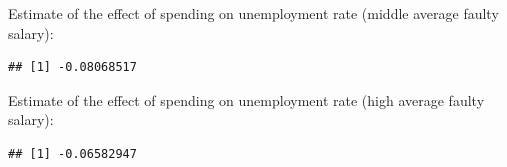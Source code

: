 \documentclass{article}\usepackage[]{graphicx}\usepackage[]{color}
\makeatletter
\newenvironment{kframe}{%
 \def\at@end@of@kframe{}%
 \ifinner\ifhmode%
  \def\at@end@of@kframe{\end{minipage}}%
  \begin{minipage}{\columnwidth}%
 \fi\fi%
 \def\FrameCommand##1{\hskip\@totalleftmargin \hskip-\fboxsep
 \colorbox{shadecolor}{##1}\hskip-\fboxsep
     \hskip-\linewidth \hskip-\@totalleftmargin \hskip\columnwidth}%
 \MakeFramed {\advance\hsize-\width
   \@totalleftmargin\z@ \linewidth\hsize
   \@setminipage}}%
 {\par\unskip\endMakeFramed%
 \at@end@of@kframe}
\newenvironment{knitrout}{}{} %
\makeatother
\begin{document}
Estimate of the effect of spending on unemployment rate (middle average faulty salary):
\begin{knitrout}
\color{fgcolor}\begin{kframe}
\begin{verbatim}
## [1] -0.08068517
\end{verbatim}
\end{kframe}
\end{knitrout}


Estimate of the effect of spending on unemployment rate (high average faulty salary):
\begin{knitrout}
\color{fgcolor}\begin{kframe}
\begin{verbatim}
## [1] -0.06582947
\end{verbatim}
\end{kframe}
\end{knitrout}
\end{document}

